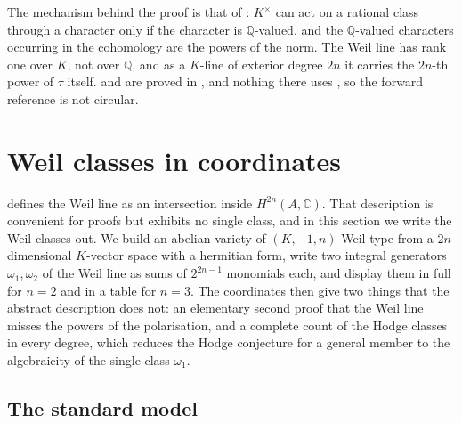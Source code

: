 \documentclass[11pt,reqno]{amsart}
\theoremstyle{plain}
\theoremstyle{definition}
\theoremstyle{remark}
\newcommand{\QQ}{\mathbb{Q}}
\newcommand{\CC}{\mathbb{C}}
\newcommand{\Kx}{K^{\times}}
\begin{document}
The mechanism behind the proof is that of : $\Kx$
can act on a rational class through a character only if the character is
$\QQ$-valued, and the $\QQ$-valued characters occurring in the cohomology
are the powers of the norm. The Weil line has rank one over $K$, not over $\QQ$, and as a
$K$-line of exterior degree $2n$ it carries the $2n$-th power of $\tau$
itself.  and  are proved
in , and nothing there uses , so the
forward reference is not circular.
\section{Weil classes in coordinates}\label{sec:explicit}

 defines the Weil line as an intersection inside
$H^{2n}(A,\CC)$. That description is convenient for proofs but exhibits no
single class, and in this section we write the Weil classes out. We build an
abelian variety of $(K,-1,n)$-Weil type from a $2n$-dimensional $K$-vector
space with a hermitian form, write two integral generators
$\omega_{1},\omega_{2}$ of the Weil line as sums of $2^{2n-1}$ monomials each,
and display them in full for $n=2$ and in a table for $n=3$. The coordinates
then give two things that the abstract description does not: an elementary
second proof that the Weil line misses the powers of the polarisation, and a
complete count of the Hodge classes in every degree, which reduces the Hodge
conjecture for a general member to the algebraicity of the single class
$\omega_{1}$.

\subsection{The standard model}
\end{document}
